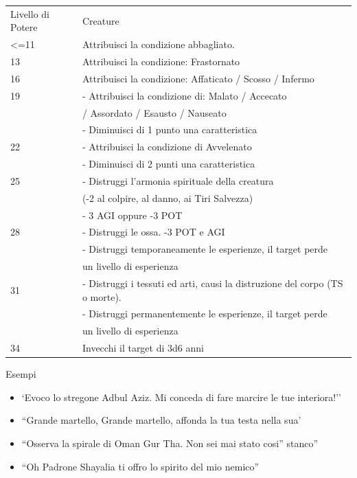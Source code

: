 \documentclass[a4paper,11pt,twoside,openany]{dndbook}
\begin{document}
\bigskip

\begin{tabular}[c]{@{}ll@{}}
\toprule 
Livello di Potere & Creature\tabularnewline
<=11 &Attribuisci la condizione abbagliato. \\
13 & Attribuisci la condizione: Frastornato\\
16 & Attribuisci la condizione: Affaticato / Scosso / Infermo\\
19 & - Attribuisci la condizione di: Malato / Accecato\\
& / Assordato / Esausto / Nauseato\\
& - Diminuisci di 1 punto una caratteristica\\
22 & - Attribuisci la condizione di Avvelenato\\
& - Diminuisci di 2 punti una caratteristica\\
25 & - Distruggi l’armonia spirituale della creatura \\
&(-2 al colpire, al danno, ai Tiri Salvezza)\\
& - 3 AGI oppure -3 POT\\
28 & - Distruggi le ossa. -3 POT e AGI\\
& - Distruggi temporaneamente le esperienze, il target perde\\
& un livello di esperienza\\
31& - Distruggi i tessuti ed arti, causi la distruzione del corpo (TS o morte).\\
& - Distruggi permanentemente le esperienze, il target perde\\
&un livello di esperienza\\
34 &Invecchi il target di 3d6 anni\\

\bottomrule
\end{tabular}

\bigskip

Esempi
\begin{itemize}
\item 
`Evoco lo stregone Adbul Aziz. Mi conceda di fare marcire le tue interiora!'' 
\item 
``Grande martello, Grande martello, affonda la tua testa nella sua' 
\item 
``Osserva la spirale di Oman Gur Tha. Non sei mai stato cosi'' stanco'' 
\item 
``Oh Padrone Shayalia ti offro lo spirito del mio nemico'' 
\end{itemize}

\bigskip
\end{document}
